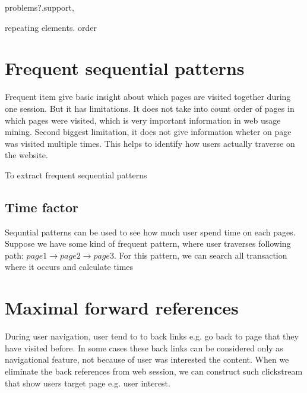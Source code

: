 \documentclass[english,a4paper]{article}
\begin{document}
problems?,support,

repeating elements. order



















\section{Frequent sequential patterns}

Frequent item give basic insight about which pages are visited together during one session. But it has limitations. It does not take into count order of pages in which pages were visited, which is very important information in web usage mining. Second biggest limitation, it does not give information wheter on page was visited multiple times. This helps to identify how users actually traverse on the website.

To extract frequent sequential patterns







\subsection{Time factor}
Sequntial patterns can be used to see how much user spend time on each pages. Suppose we have some kind of frequent pattern, where user traverses following path: $page1 \rightarrow page2 \rightarrow page3$. For this pattern, we can search all transaction where it occurs and calculate times













\section{Maximal forward references}

During user navigation, user tend to to back links e.g. go back to page that they have visited before. In some cases these back links can be considered only as navigational feature, not because of user was interested the content.  When we eliminate the back references from web session, we can construct such clickstream that show users target page e.g. user interest.
\end{document}
